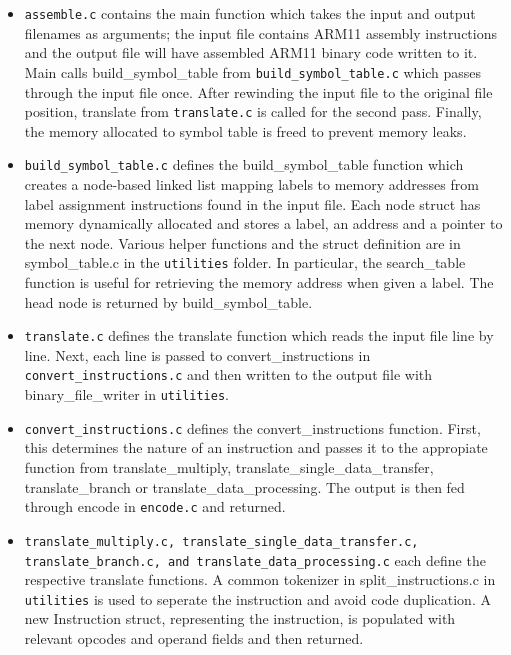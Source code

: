 \documentclass[11pt]{article}
\begin{document}
\begin{itemize}
\item \texttt{assemble.c} contains the main function which takes the input and output filenames as arguments; the input file contains ARM11 assembly instructions and the output file will have assembled ARM11 binary code written to it. Main calls build\_symbol\_table from \texttt{build\_symbol\_table.c} which passes through the input file once. After rewinding the input file to the original file position, translate from \texttt{translate.c} is called for the second pass. Finally, the memory allocated to symbol table is freed to prevent memory leaks.

\item \texttt{build\_symbol\_table.c} defines the build\_symbol\_table function which creates a node-based linked list mapping labels to memory addresses from label assignment instructions found in the input file. Each node struct has memory dynamically allocated and stores a label, an address and a pointer to the next node. Various helper functions and the struct definition are in symbol\_table.c in the \texttt{utilities} folder. In particular, the search\_table function is useful for retrieving the memory address when given a label. The head node is returned by build\_symbol\_table.

\item \texttt{translate.c} defines the translate function which reads the input file line by line. Next, each line is passed to convert\_instructions in \texttt{convert\_instructions.c} and then written to the output file with binary\_file\_writer in \texttt{utilities}.

\item \texttt{convert\_instructions.c} defines the convert\_instructions function. First, this determines the nature of an instruction and passes it to the appropiate function from translate\_multiply, translate\_single\_data\_transfer, translate\_branch or translate\_data\_processing. The output is then fed through encode in \texttt{encode.c} and returned.

\item \texttt{translate\_multiply.c, translate\_single\_data\_transfer.c, translate\_branch.c, and translate\_data\_processing.c} each define the respective translate functions. A common tokenizer in split\_instructions.c in \texttt{utilities} is used to seperate the instruction and avoid code duplication. A new Instruction struct, representing the instruction, is populated with relevant opcodes and operand fields and then returned.


\end{itemize}
\end{document}
